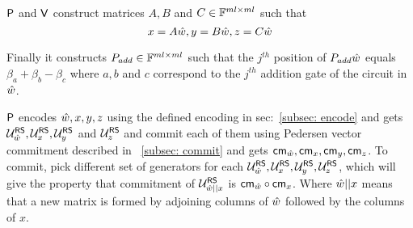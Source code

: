 $\mathsf{P}$ and $\mathsf{V}$ construct matrices $A, B$ and $C \in \mathbb{F}^{ml \times ml}$ such that 
$$x = A \hat{w}, y= B \hat{w}, z= C \hat{w}$$

Finally it constructs $P_{add} \in \mathbb{F}^{ml \times ml}$ such that the $j^{th}$ position of $P_{add} \hat{w}$ equals $\beta_a + \beta_b - \beta_c$ where $a, b$ and $c$ correspond to the $j^{th}$ addition gate of the circuit in $\hat{w}$.

$\mathsf{P}$ encodes $\hat{w} , x, y , z$ using the defined encoding in sec:~\ref{subsec: encode} and gets $\mathcal{U}^{\mathsf{RS}}_{\hat{w}}, \mathcal{U}^{\mathsf{RS}}_x, \mathcal{U}^{\mathsf{RS}}_y$ and $\mathcal{U}^{\mathsf{RS}}_z$ and commit each of them using Pedersen vector commitment described in ~\ref{subsec: commit} and gets $\mathsf{cm}_{\hat{w}}, \mathsf{cm}_x, \mathsf{cm}_y, \mathsf{cm}_z$. To commit, pick different set of generators for each $\mathcal{U}^{\mathsf{RS}}_{\hat{w}}, \mathcal{U}^{\mathsf{RS}}_x, \mathcal{U}^{\mathsf{RS}}_y, \mathcal{U}^{\mathsf{RS}}_z$, which will give the property that commitment of $\mathcal{U}^{\mathsf{RS}}_{\hat{w}||x}$ is $\mathsf{cm}_{\hat{w}} \circ \mathsf{cm}_x$. Where $\hat{w}||x$ means that a new matrix is formed by adjoining columns of $\hat{w}$ followed by the columns of $x$. 

